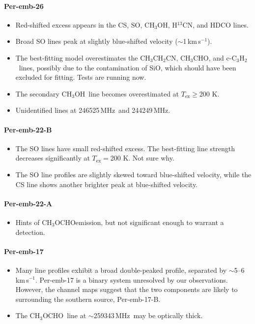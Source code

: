 \documentclass[twocolumn]{aastex62}
\newcommand{\kms}{\mbox{\,km\,s$^{-1}$}}
\newcommand{\mhz}{\mbox{\,MHz}}
\newcommand{\htcn}{\mbox{H$^{13}$CN}}
\newcommand{\methylformate}{\mbox{CH$_{3}$OCHO}}
\newcommand{\methanol}{\mbox{CH$_{3}$OH}}
\newcommand{\acetaldehyde}{\mbox{CH$_{3}$CHO}}
\newcommand{\ethylcyanide}{\mbox{CH$_{3}$CH$_{2}$CN}}
\newcommand{\cctht}{\mbox{c-C$_{3}$H$_{2}$}}
\begin{document}
\paragraph{Per-emb-26}
\begin{itemize}
  \item Red-shifted excess appears in the CS, SO, \methanol, \htcn, and HDCO lines.
  \item Broad SO lines peak at slightly blue-shifted velocity ($\sim$1\kms).
  \item The best-fitting model overestimates the \ethylcyanide, \acetaldehyde, and \cctht\ lines, possibly due to the contamination of SiO, which should have been excluded for fitting.  Tests are running now.
  \item The secondary \methanol\ line becomes overestimated at $T_\text{ex} \geq $200 K.
  \item Unidentified lines at 246525\mhz\ and 244249\mhz.
\end{itemize}

\paragraph{Per-emb-22-B}
\begin{itemize}
  \item The SO lines have small red-shifted excess.  The best-fitting line strength decreases significantly at $T_\text{ex} = $200 K.  Not sure why.
  \item The SO line profiles are slightly skewed toward blue-shifted velocity, while the CS line shows another brighter peak at blue-shifted velocity.
\end{itemize}

\paragraph{Per-emb-22-A}
\begin{itemize}
  \item Hints of \methylformate emission, but not significant enough to warrant a detection.
\end{itemize}

\paragraph{Per-emb-17}
\begin{itemize}
  \item Many line profiles exhibit a broad double-peaked profile, separated by $\sim$5--6\kms.  Per-emb-17 is a binary system unresolved by our observations.  However, the channel maps suggest that the two components are likely to surrounding the southern source, Per-emb-17-B.
  \item The \methylformate\ line at $\sim$259343\mhz\ may be optically thick.
\end{itemize}
\end{document}
